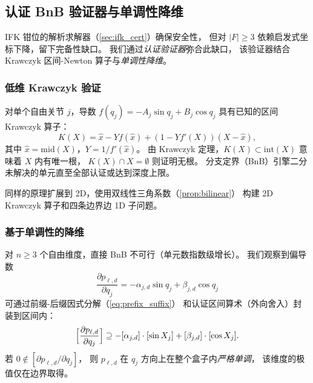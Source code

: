 \documentclass[journal]{IEEEtran}
\begin{document}
\subsection{认证 BnB 验证器与单调性降维}\label{sec:certified_verifier}

IFK 钳位的解析求解器（\cref{sec:ifk_cert}）确保安全性，
但对 $|F|\geq 3$ 依赖启发式坐标下降，留下完备性缺口。
我们通过\emph{认证验证器}弥合此缺口，
该验证器结合 Krawczyk 区间-Newton 算子与\emph{单调性降维}。

\subsubsection{低维 Krawczyk 验证}

对单个自由关节 $j$，导数
$f(q_j) = -A_j\sin q_j + B_j\cos q_j$
具有已知的区间 Krawczyk 算子：
\begin{equation}\label{eq:krawczyk1d}
  K(X) = \hat x - Y f(\hat x) + (1 - Y f'(X))(X - \hat x),
\end{equation}
其中 $\hat x = \text{mid}(X)$，$Y = 1/f'(\hat x)$。
由 Krawczyk 定理，$K(X) \subset \text{int}(X)$ 意味着 $X$ 内有唯一根，
$K(X) \cap X = \emptyset$ 则证明无根。
分支定界（BnB）引擎二分未解决的单元直至全部认证或达到深度上限。

同样的原理扩展到 2D，使用双线性三角系数（\cref{prop:bilinear}）
构建 2D Krawczyk 算子和四条边界边 1D 子问题。

\subsubsection{基于单调性的降维}

对 $n \geq 3$ 个自由维度，直接 BnB 不可行（单元数指数级增长）。
我们观察到偏导数
\begin{equation}\label{eq:mono_grad}
  \frac{\partial p_{\ell,d}}{\partial q_j}
  = -\alpha_{j,d}\sin q_j + \beta_{j,d}\cos q_j
\end{equation}
可通过前缀-后缀因式分解（\cref{eq:prefix_suffix}）
和认证区间算术（外向舍入）封装到区间内：
\begin{equation}\label{eq:mono_test}
  \Bigl[\frac{\partial p_{\ell,d}}{\partial q_j}\Bigr]
  \supseteq -[\alpha_{j,d}]\cdot[\sin X_j]
  + [\beta_{j,d}]\cdot[\cos X_j].
\end{equation}
若 $0 \notin [\partial p_{\ell,d}/\partial q_j]$，
则 $p_{\ell,d}$ 在 $q_j$ 方向上在整个盒子内\emph{严格单调}，
该维度的极值仅在边界取得。
\end{document}
